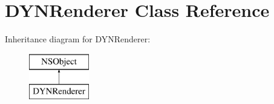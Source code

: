 \hypertarget{interface_d_y_n_renderer}{\section{D\-Y\-N\-Renderer Class Reference}
\label{interface_d_y_n_renderer}
}
Inheritance diagram for D\-Y\-N\-Renderer\-:\begin{figure}[H]
\begin{center}
\leavevmode
\includegraphics[height=2.000000cm]{interface_d_y_n_renderer}
\end{center}
\end{figure}
